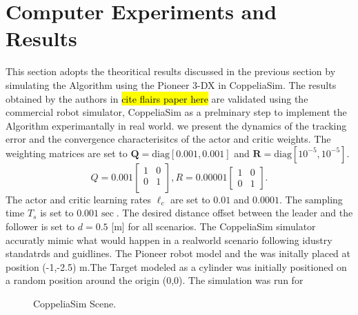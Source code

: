\documentclass[conference]{IEEEtran}
\begin{document}
    


  

 \section{Computer Experiments and Results}
 \label{sec:resultsExperiments}
 This section adopts the theoritical results discussed in the previous section by simulating the Algorithm using the Pioneer 3-DX in CoppeliaSim. The results obtained by the authors in \hl{cite flairs paper here} are validated using the commercial robot simulator, CoppeliaSim as a prelminary step to implement the Algorithm experimantally in real world. we present the dynamics of the tracking error and the convergence characterisitcs of the actor and critic weights. The weighting matrices are set to $\mathbf{Q} = \mathrm{diag}[0.001,0.001]$ and $\mathbf{R} = \mathrm{diag}[10^{-5}, 10^{-5}].$ %
  \[Q=0.001 
  \begin{bmatrix}
  1       & 0   \\
  0       & 1   \\
  \end{bmatrix},
  R=0.00001
  \begin{bmatrix}
  1       & 0 \\
  0       & 1 
  \end{bmatrix}.\]
 The actor and critic learning rates $\ell_c$ are set to  $0.01$ and $0.0001$. The sampling time $T_s$ is set to $0.001 \sec.$ The desired distance offset between the leader and the follower is set to $ d = 0.5$ [m] for all scenarios.
 The CoppeliaSim simulator accuratly mimic what would happen in a realworld scenario following idustry standatrds and guidlines. The Pioneer robot model and the  was initally placed at position (-1,-2.5) m.The Target modeled as a cylinder was initially positioned on a random position around the origin (0,0). The simulation was run for 
\begin{figure}
   \centering
   \caption{CoppeliaSim Scene.}
   \label{fig:CoppeliaSim Scene}
 \end{figure}  
    
\end{document}
